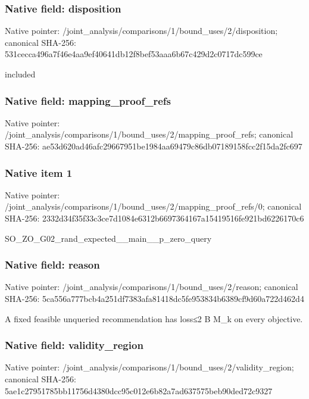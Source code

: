 \documentclass[10pt,a4paper]{article}
\begin{document}
\subsubsection{Native field: disposition}
Native pointer: /joint\_\allowbreak{}analysis/comparisons/1/bound\_\allowbreak{}uses/2/disposition; canonical SHA-256: 531cecca496a7f46e4aa9ef40641db12f8bef53aaa6b67c429d2c0717dc599ce

\begingroup\raggedright\sloppy included\par\endgroup

\subsubsection{Native field: mapping\_\allowbreak{}proof\_\allowbreak{}refs}
Native pointer: /joint\_\allowbreak{}analysis/comparisons/1/bound\_\allowbreak{}uses/2/mapping\_\allowbreak{}proof\_\allowbreak{}refs; canonical SHA-256: ae53d620ad46afc29667951be1984aa69479c86db07189158fcc2f15da2fc697

\subsubsection{Native item 1}
Native pointer: /joint\_\allowbreak{}analysis/comparisons/1/bound\_\allowbreak{}uses/2/mapping\_\allowbreak{}proof\_\allowbreak{}refs/0; canonical SHA-256: 2332d34f35f33c3ce7d1084e6312b6697364167a15419516fe921bd6226170c6

\begingroup\raggedright\sloppy SO\_\allowbreak{}ZO\_\allowbreak{}G02\_\allowbreak{}rand\_\allowbreak{}expected\_\allowbreak{}\_\allowbreak{}main\_\allowbreak{}\_\allowbreak{}p\_\allowbreak{}zero\_\allowbreak{}query\par\endgroup

\subsubsection{Native field: reason}
Native pointer: /joint\_\allowbreak{}analysis/comparisons/1/bound\_\allowbreak{}uses/2/reason; canonical SHA-256: 5ca556a777bcb4a251df7383afa81418dc5fe953834b6389cf9d60a722d462d4

\begingroup\raggedright\sloppy A fixed feasible unqueried recommendation has loss{\AtlasUnicodeSymbols ≤}\allowbreak{}2 B M\_\allowbreak{}k on every objective.\par\endgroup

\subsubsection{Native field: validity\_\allowbreak{}region}
Native pointer: /joint\_\allowbreak{}analysis/comparisons/1/bound\_\allowbreak{}uses/2/validity\_\allowbreak{}region; canonical SHA-256: 5ae1c27951785bb11756d4380dcc95c012e6b82a7ad637575beb90ded72c9327
\end{document}
